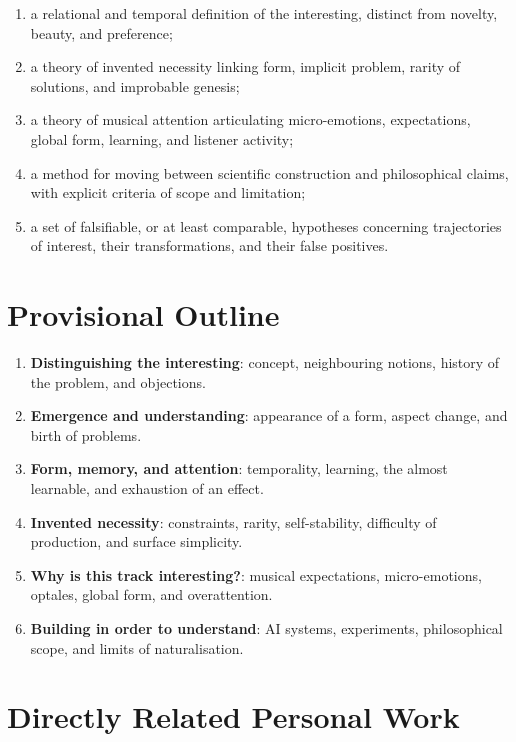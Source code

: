\documentclass[11pt,a4paper]{article}
\begin{document}
\begin{enumerate}
  \item a relational and temporal definition of the interesting, distinct from
        novelty, beauty, and preference;
  \item a theory of invented necessity linking form, implicit problem, rarity of
        solutions, and improbable genesis;
  \item a theory of musical attention articulating micro-emotions,
        expectations, global form, learning, and listener activity;
  \item a method for moving between scientific construction and philosophical
        claims, with explicit criteria of scope and limitation;
  \item a set of falsifiable, or at least comparable, hypotheses concerning
        trajectories of interest, their transformations, and their false
        positives.
\end{enumerate}

\section{Provisional Outline}

\begin{enumerate}
  \item \textbf{Distinguishing the interesting}: concept, neighbouring notions,
        history of the problem, and objections.
  \item \textbf{Emergence and understanding}: appearance of a form, aspect
        change, and birth of problems.
  \item \textbf{Form, memory, and attention}: temporality, learning, the almost
        learnable, and exhaustion of an effect.
  \item \textbf{Invented necessity}: constraints, rarity, self-stability,
        difficulty of production, and surface simplicity.
  \item \textbf{Why is this track interesting?}: musical expectations,
        micro-emotions, optales, global form, and overattention.
  \item \textbf{Building in order to understand}: AI systems, experiments,
        philosophical scope, and limits of naturalisation.
\end{enumerate}

\section{Directly Related Personal Work}
\end{document}
